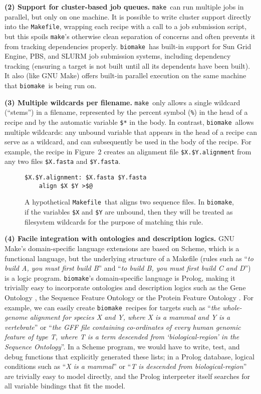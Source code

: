 \documentclass{bioinfo}
\newcommand\Makefile{{\tt Makefile}}
\newcommand\make{{\tt make}}
\newcommand\biomake{{\tt biomake}}
\begin{document}
{\bf (2) Support for cluster-based job queues.}
\make\ can run multiple jobs in parallel, but only on one machine.
It is possible to write cluster support directly into the \Makefile,
wrapping each recipe with a call to a job submission script,
but this spoils \make's otherwise clean separation of concerns
and often prevents it from tracking dependencies properly.
\biomake\ has built-in support for Sun Grid Engine, PBS, and SLURM job submission systems,
including dependency tracking (ensuring a target is not built until all its dependents have been built).
It also (like GNU Make) offers built-in parallel execution on
the same machine that \biomake\ is being run on.

{\bf (3) Multiple wildcards per filename.}
\make\ only allows a single wildcard (``stems'') in a filename,
represented by the percent symbol ({\tt \%}) in the head of a recipe and by the automatic variable {\tt \$*} in the body.
In contrast, \biomake\ allows multiple wildcards: any unbound variable that appears in the head of a recipe can serve as a wildcard,
and can subsequently be used in the body of the recipe.
For example, the recipe in Figure~2 creates an alignment file {\tt \$X.\$Y.alignment} from any two files {\tt \$X.fasta} and {\tt \$Y.fasta}.


\begin{figure}[H]
\begin{Verbatim}[frame=single]
$X.$Y.alignment: $X.fasta $Y.fasta
    align $X $Y >$@
\end{Verbatim}
\caption{
  A hypothetical \Makefile\ that aligns two sequence files.
  In \biomake, if the variables {\tt \$X} and {\tt \$Y} are unbound, then they will be treated as filesystem wildcards
  for the purpose of matching this rule.
}
\end{figure}

{\bf (4) Facile integration with ontologies and description logics.}
GNU Make's domain-specific language extensions are based on Scheme, which is a functional language,
but the underlying structure of a Makefile (rules such as ``{\em to build A, you must first build B}'' and ``{\em to build B, you must first build C and D}'')
is a logic program.
\biomake's domain-specific language is Prolog, making it trivially easy to incorporate ontologies and description logics
such as the Gene Ontology \citep{GeneOntology2000,GeneOntology2015}, the Sequence Feature Ontology \citep{SequenceOntology2005} or the Protein Feature Ontology \citep{ProteinFeatureOntology2008}.
For example, we can easily create \biomake\ recipes for targets such as ``{\em the whole-genome alignment for species X and Y, where X is a mammal and Y is a vertebrate}''
or ``{\em the GFF file containing co-ordinates of every human genomic feature of type T, where T is a term descended from `biological-region' in the Sequence Ontology}''.
In a Scheme program, we would have to write, test, and debug functions that explicitly generated these lists;
in a Prolog database, logical conditions such as ``{\em X is a mammal}'' or ``{\em T is descended from biological-region}'' are trivially easy to model directly,
and the Prolog interpreter itself searches for all variable bindings that fit the model.
\end{document}
